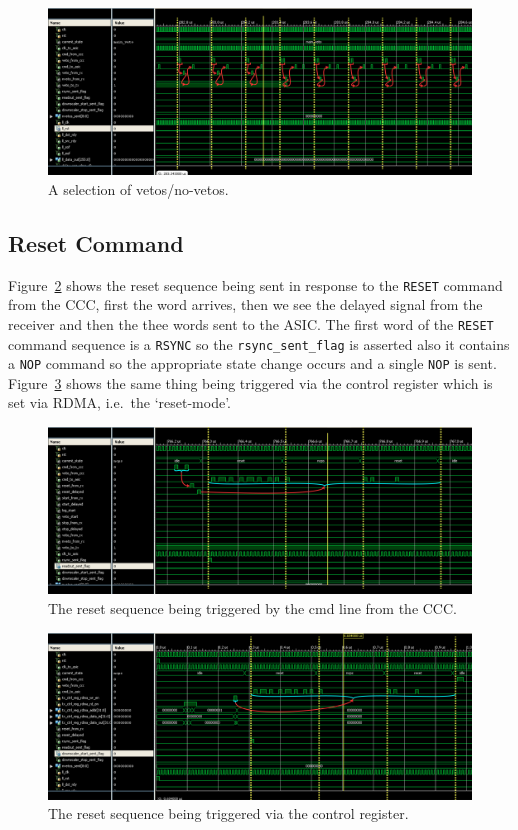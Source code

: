 \begin{figure}[htbp]
  \centering
  \includegraphics[width=\textwidth]{images/isim/edited/veto_no_veto.png}
  \caption{A selection of vetos/no-vetos.}
  \label{fig:isim_veto_no_veto}
\end{figure}
\subsection{Reset Command} %
\label{sec:reset_command}
Figure~\ref{fig:isim_reset_cmd} shows the reset sequence being sent in response to the \texttt{RESET} command from the CCC, first the word arrives, then we see the delayed signal from the receiver and then the thee words sent to the ASIC. The first word of the \texttt{RESET} command sequence is a \texttt{RSYNC} so the \texttt{rsync\_sent\_flag} is asserted also it contains a \texttt{NOP} command so the appropriate state change occurs and a single \texttt{NOP} is sent. Figure~\ref{fig:isim_reset_rdma} shows the same thing being triggered via the control register which is set via RDMA, i.e.\ the `reset-mode'.
\begin{figure}[htbp]
  \centering
  \includegraphics[width=\textwidth]{images/isim/edited/reset_cmd.png}
  \caption{The reset sequence being triggered by the cmd line from the CCC.}
  \label{fig:isim_reset_cmd}
\end{figure}
\begin{figure}[htbp]
  \centering
  \includegraphics[width=\textwidth]{images/isim/edited/reset_rdma.png}
  \caption{The reset sequence being triggered via the control register.}
  \label{fig:isim_reset_rdma}
\end{figure}
